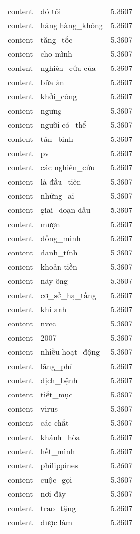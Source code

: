 \documentclass{article}
\begin{document}
\begin{tabular}{lll}
content & đó tôi & 5.3607\\
content & hãng hàng\_không & 5.3607\\
content & tăng\_tốc & 5.3607\\
content & cho mình & 5.3607\\
content & nghiên\_cứu của & 5.3607\\
content & bữa ăn & 5.3607\\
content & khởi\_công & 5.3607\\
content & ngưng & 5.3607\\
content & người có\_thể & 5.3607\\
content & tân\_binh & 5.3607\\
content & pv & 5.3607\\
content & các nghiên\_cứu & 5.3607\\
content & là đầu\_tiên & 5.3607\\
content & những\_ai & 5.3607\\
content & giai\_đoạn đầu & 5.3607\\
content & mượn & 5.3607\\
content & đồng\_minh & 5.3607\\
content & danh\_tính & 5.3607\\
content & khoản tiền & 5.3607\\
content & này ông & 5.3607\\
content & cơ\_sở\_hạ\_tầng & 5.3607\\
content & khi anh & 5.3607\\
content & nvcc & 5.3607\\
content & 2007 & 5.3607\\
content & nhiều hoạt\_động & 5.3607\\
content & lãng\_phí & 5.3607\\
content & dịch\_bệnh & 5.3607\\
content & tiết\_mục & 5.3607\\
content & virus & 5.3607\\
content & các chất & 5.3607\\
content & khánh\_hòa & 5.3607\\
content & hết\_mình & 5.3607\\
content & philippines & 5.3607\\
content & cuộc\_gọi & 5.3607\\
content & nơi đây & 5.3607\\
content & trao\_tặng & 5.3607\\
content & được làm & 5.3607\\

\end{tabular}
\end{document}
